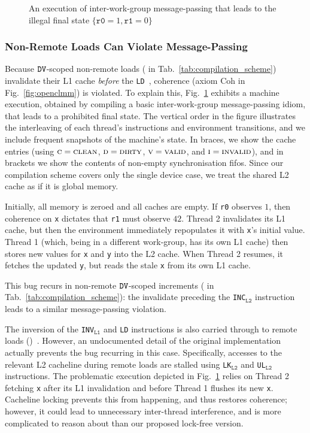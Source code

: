 \documentclass[svgnames,10pt]{sigplanconf}
\theoremstyle{definition}
\newcommand\axiom[1]{\textsf{#1}}
\newcommand\sdv{{\tt DV}}
\newcommand\INSld{\texttt{LD}}
\newcommand\INSincl[1]{\texttt{INC$_{\texttt{L#1}}$}}
\newcommand\INSinvall[1]{\texttt{INV$_{\texttt{L#1}}$}}
\newcommand\INSlk[1]{\texttt{LK$_{\texttt{#1}}$}}
\newcommand\INSul[1]{\texttt{UL$_{\texttt{#1}}$}}
\begin{document}
\begin{figure}
\caption{An execution of inter-work-group message-passing that leads
to the illegal final state $\{\texttt{r0}=1,\texttt{r1}=0\}$}
\label{fig:mp_violation}
\end{figure}

\subsubsection{Non-Remote Loads Can Violate Message-Passing}
Because $\sdv$-scoped non-remote loads ( in
Tab.~\ref{tab:compilation_scheme}) invalidate their L1 cache
\emph{before} the \INSld{}~\cite[\S2.3]{orr+15}, coherence (axiom
\axiom{Coh} in Fig.~\ref{fig:openclmm}) is violated. To explain this,
Fig.~\ref{fig:mp_violation} exhibits a machine execution, obtained by
compiling a basic inter-work-group message-passing idiom, that leads
to a prohibited final state. The vertical order in the figure
illustrates the interleaving of each thread's instructions and
environment transitions, and we include frequent snapshots of the
machine's state. In braces, we show the cache entries (using
$\textsc{c}=\textsc{clean}$, $\textsc{d}=\textsc{dirty}$,
$\textsc{v}=\textsc{valid}$, and $\textsc{i}=\textsc{invalid}$), and
in brackets we show the contents of non-empty synchronisation
fifos. Since our compilation scheme covers only the single device
case, we treat the shared L2 cache as if it is global memory.

Initially, all memory is zeroed and all caches are empty. If
\texttt{r0} observes $1$, then coherence on \texttt{x} dictates that
\texttt{r1} must observe $42$. Thread 2 invalidates its L1 cache, but
then the environment immediately repopulates it with \texttt{x}'s
initial value. Thread 1 (which, being in a different work-group, has
its own L1 cache) then stores new values for \texttt{x} and \texttt{y}
into the L2 cache. When Thread 2 resumes, it fetches the updated
\texttt{y}, but reads the stale \texttt{x} from its own L1 cache.

This bug recurs
in non-remote $\sdv$-scoped increments ( in
Tab.~\ref{tab:compilation_scheme}): the invalidate preceding the
\INSincl2{} instruction leads to a similar message-passing violation.

The inversion of the \INSinvall1 and \INSld{} instructions is also
carried through to remote loads
()~\cite[\S4.2]{orr+15}. However, an undocumented detail of
the original implementation actually prevents the bug recurring in
this case. Specifically, accesses to the relevant L2 cacheline during
remote loads are stalled using \INSlk{L2} and \INSul{L2}
instructions. The problematic execution depicted in
Fig.~\ref{fig:mp_violation} relies on Thread 2 fetching \texttt{x}
after its L1 invalidation and before Thread 1 flushes its new
\texttt{x}. Cacheline locking prevents this from happening, and thus
restores coherence; however, it could lead to unnecessary inter-thread
interference, and is more complicated to reason about than our
proposed lock-free version.
\end{document}
